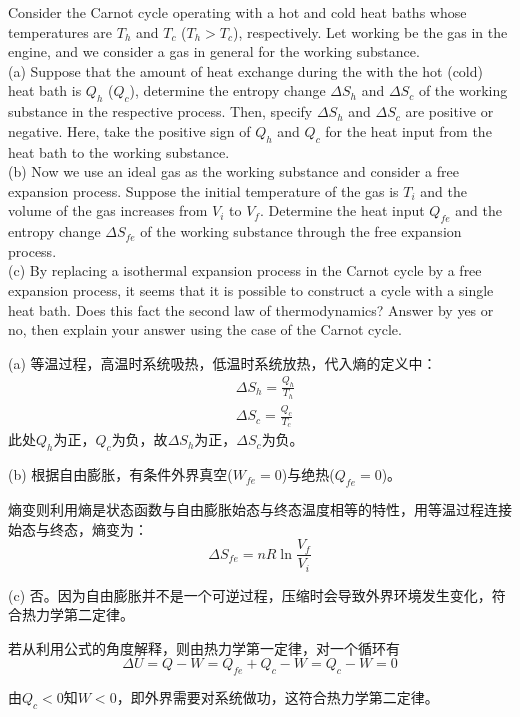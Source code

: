 \begin{solution}[Entropy]
    Consider the Carnot cycle operating with a hot and cold heat baths whose temperatures are $T_h$ and
    $T_c$ ($T_h > T_c$), respectively. Let working  be the gas in the engine, and we consider a gas in
    general for the working substance.\\
    (a) Suppose that the amount of heat exchange during the  with the hot (cold) heat bath is
    $Q_h$ ($Q_c$), determine the entropy change $\Delta S_h$ and $\Delta S_c$ of the working substance in the respective
    process. Then, specify $\Delta S_h$ and $\Delta S_c$ are positive or negative. Here, take the positive sign of $Q_h$ and $Q_c$ for the heat input from the heat bath to the \linebreak working substance.\\
    (b) Now we use an ideal gas as the working substance and consider a free expansion process. Suppose the
    initial temperature of the gas is $T_i$ and the volume of the gas increases from $V_i$ to $V_f$. Determine the
    heat input $Q_{fe}$ and the entropy change $\Delta S_{fe}$ of the working substance through the free expansion
    process.\\
    (c) By replacing a  isothermal expansion process in the Carnot cycle by a free expansion
    process, it seems that it is possible to construct a cycle with a single heat bath. Does this fact
     the second law of thermodynamics? Answer by yes or no, then explain your answer using
    the case of the Carnot cycle.

    \tcbrule

    (a) 等温过程，高温时系统吸热，低温时系统放热，代入熵的定义中：
    \begin{equation*}
        \begin{aligned}
             & \Delta S_h = \frac{Q_h}{T_h} \\
             & \Delta S_c = \frac{Q_c}{T_c}
        \end{aligned}
    \end{equation*}
    此处$Q_h$为正，$Q_c$为负，故$\Delta S_h$为正，$\Delta S_c$为负。

    (b) 根据自由膨胀，有条件外界真空($W_{fe} = 0$)与绝热($Q_{fe} = 0$)。

    熵变则利用熵是状态函数与自由膨胀始态与终态温度相等的特性，用等温过程连接始态与终态，熵变为：
    \begin{equation*}
        \Delta S_{fe} = nR\ln{\frac{V_f}{V_i}}
    \end{equation*}

    (c) 否。因为自由膨胀并不是一个可逆过程，压缩时会导致外界环境发生变化，符合热力学第二定律。

    若从利用公式的角度解释，则由热力学第一定律，对一个循环有
    \[\Delta U=Q-W=Q_{fe}+Q_c-W=Q_c-W=0\]

    由$Q_c<0$知$W<0$，即外界需要对系统做功，这符合热力学第二定律。
\end{solution}
